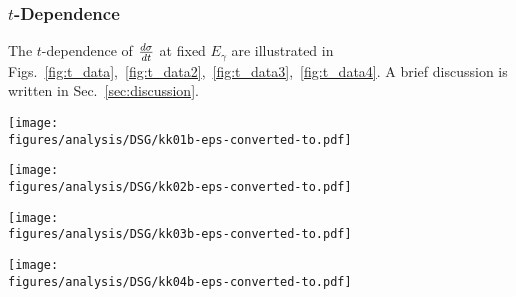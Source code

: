 \subsubsection{$t$-Dependence}
\label{tDep}
The $t$-dependence of $\frac{\lowercase{d}\sigma}{\lowercase{d}t}$ at fixed $E_{\gamma}$ are illustrated in Figs.~\ref{fig:t_data},~\ref{fig:t_data2},~\ref{fig:t_data3},~\ref{fig:t_data4}. A brief discussion is written in Sec.~\ref{sec:discussion}.
\begin{figure*}[htb!]
\texttt{[image: \\figures/analysis/DSG/kk01b-eps-converted-to.pdf]}
\caption[$\pi^0$ photoproduction cross section, $(d\sigma/dt)$, off the proton at $E_{\gamma}$ = 1275 -- 2225~MeV versus momentum transfer $t$]{\label{fig:t_data}(Color online) $\pi^0$ photoproduction cross section, $(d\sigma/dt)$, off the proton at $E_{\gamma}$ = 1275 -- 2225~MeV versus momentum transfer $t$. Notation as in Fig.~\protect\ref{fig:results.xsection1}.}
\end{figure*}

\begin{figure*}[htb!]
\texttt{[image: \\figures/analysis/DSG/kk02b-eps-converted-to.pdf]}
\caption[$\pi^0$ photoproduction cross section, $(d\sigma/dt)$, off the proton at $E_{\gamma}$ = 2275 -- 3375~MeV versus momentum transfer $t$]{\label{fig:t_data2}(Color online) $\pi^0$ photoproduction cross section, $(d\sigma/dt)$, off the proton at $E_{\gamma}$ = 2275 -- 3375~MeV versus momentum transfer $t$. Notation as in Fig.~\protect\ref{fig:results.xsection1}.}
\end{figure*}

\begin{figure*}[htb!]
\texttt{[image: \\figures/analysis/DSG/kk03b-eps-converted-to.pdf]}
\caption[$\pi^0$ photoproduction cross section, $(d\sigma/dt)$, off the proton at $E_{\gamma}$ = 3425 -- 4425~MeV versus momentum transfer $t$]{\label{fig:t_data3}(Color online) $\pi^0$ photoproduction cross section, $(d\sigma/dt)$, off the proton at $E_{\gamma}$ = 3425 -- 4425~MeV versus momentum transfer $t$. Notation as in Fig.~\protect\ref{fig:results.xsection1}.}
\end{figure*}

\begin{figure*}[htb!]
\texttt{[image: \\figures/analysis/DSG/kk04b-eps-converted-to.pdf]}
\caption[$\pi^0$ photoproduction cross section, $(d\sigma/dt)$, off the proton at  $E_{\gamma}$ = 4475 -- 5425~MeV versus momentum transfer $t$]{\label{fig:t_data4}(Color online) $\pi^0$ photoproduction cross section, $(d\sigma/dt)$, off the proton at  $E_{\gamma}$ = 4475 -- 5425~MeV versus momentum transfer $t$. Notation as in Fig.~\protect\ref{fig:results.xsection1}.}
\end{figure*}


